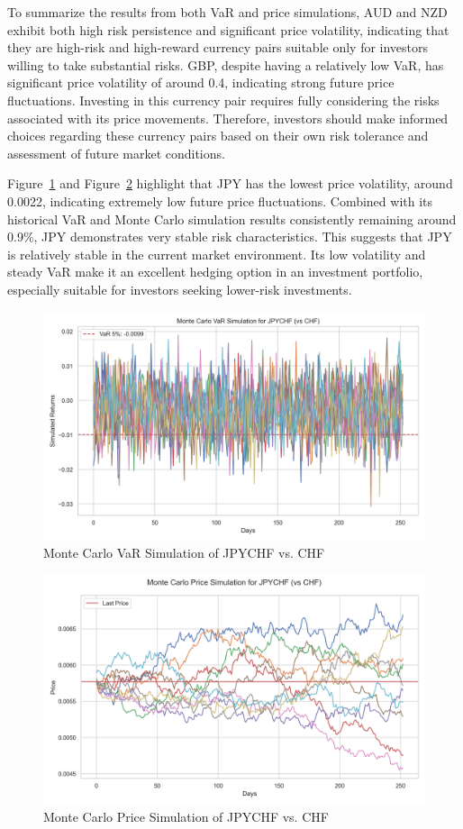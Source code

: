 \documentclass{article}
\begin{document}
To summarize the results from both VaR and price simulations, AUD and NZD exhibit both high risk persistence and significant price volatility, indicating that they are high-risk and high-reward currency pairs suitable only for investors willing to take substantial risks. GBP, despite having a relatively low VaR, has significant price volatility of around 0.4, indicating strong future price fluctuations. Investing in this currency pair requires fully considering the risks associated with its price movements. Therefore, investors should make informed choices regarding these currency pairs based on their own risk tolerance and assessment of future market conditions.

Figure~\ref{fig:monte_carlo_var_simulation_JPYCHF_vs_CHF} and Figure~\ref{fig:monte_carlo_price_simulation_JPYCHF_vs_CHF} highlight that JPY has the lowest price volatility, around 0.0022, indicating extremely low future price fluctuations. Combined with its historical VaR and Monte Carlo simulation results consistently remaining around 0.9\%, JPY demonstrates very stable risk characteristics. This suggests that JPY is relatively stable in the current market environment. Its low volatility and steady VaR make it an excellent hedging option in an investment portfolio, especially suitable for investors seeking lower-risk investments.

\begin{figure}[h]
    \centering  \includegraphics[width=0.75\linewidth]{reports/figures/monte_carlo_var_simulation_JPYCHF_vs_CHF.png}
    \caption{Monte Carlo VaR Simulation of JPYCHF vs. CHF}   \label{fig:monte_carlo_var_simulation_JPYCHF_vs_CHF}
\end{figure}

\begin{figure}[h]
    \centering
    \includegraphics[width=0.75\linewidth]{reports/figures/monte_carlo_price_simulation_JPYCHF_vs_CHF.png}
    \caption{Monte Carlo Price Simulation of JPYCHF vs. CHF}  \label{fig:monte_carlo_price_simulation_JPYCHF_vs_CHF}
\end{figure}
\end{document}
